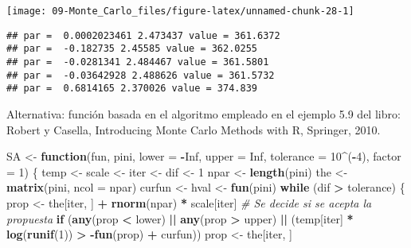 \documentclass[
]{book}
\newenvironment{Shaded}{\begin{snugshade}}{\end{snugshade}}
\newcommand{\CommentTok}[1]{\textcolor[rgb]{0.56,0.35,0.01}{\textit{#1}}}
\newcommand{\ControlFlowTok}[1]{\textcolor[rgb]{0.13,0.29,0.53}{\textbf{#1}}}
\newcommand{\DataTypeTok}[1]{\textcolor[rgb]{0.13,0.29,0.53}{#1}}
\newcommand{\DecValTok}[1]{\textcolor[rgb]{0.00,0.00,0.81}{#1}}
\newcommand{\KeywordTok}[1]{\textcolor[rgb]{0.13,0.29,0.53}{\textbf{#1}}}
\newcommand{\NormalTok}[1]{#1}
\newcommand{\OperatorTok}[1]{\textcolor[rgb]{0.81,0.36,0.00}{\textbf{#1}}}
\newcommand{\OtherTok}[1]{\textcolor[rgb]{0.56,0.35,0.01}{#1}}
\newcommand{\StringTok}[1]{\textcolor[rgb]{0.31,0.60,0.02}{#1}}
\theoremstyle{break}
\theoremstyle{definition}
\theoremstyle{definition}
\theoremstyle{definition}
\theoremstyle{remark}
\begin{document}
\begin{center}\texttt{[image: 09-Monte\_Carlo\_files/figure-latex/unnamed-chunk-28-1]} \end{center}

\begin{verbatim}
## par =  0.0002023461 2.473437 value = 361.6372 
## par =  -0.182735 2.45585 value = 362.0255 
## par =  -0.0281341 2.484467 value = 361.5801 
## par =  -0.03642928 2.488626 value = 361.5732 
## par =  0.6814165 2.370026 value = 374.839
\end{verbatim}

Alternativa: función basada en el algoritmo empleado en el ejemplo 5.9 del libro:
Robert y Casella, Introducing Monte Carlo Methods with R, Springer, 2010.

\begin{Shaded}
\begin{Highlighting}[]
\NormalTok{SA <-}\StringTok{ }\ControlFlowTok{function}\NormalTok{(fun, pini, }\DataTypeTok{lower =} \OperatorTok{-}\OtherTok{Inf}\NormalTok{, }\DataTypeTok{upper =} \OtherTok{Inf}\NormalTok{, }\DataTypeTok{tolerance =} \DecValTok{10}\OperatorTok{^}\NormalTok{(}\OperatorTok{-}\DecValTok{4}\NormalTok{), }\DataTypeTok{factor =} \DecValTok{1}\NormalTok{) \{}
\NormalTok{  temp <-}\StringTok{ }\NormalTok{scale <-}\StringTok{ }\NormalTok{iter <-}\StringTok{ }\NormalTok{dif <-}\StringTok{ }\DecValTok{1}
\NormalTok{  npar <-}\StringTok{ }\KeywordTok{length}\NormalTok{(pini) }
\NormalTok{  the <-}\StringTok{ }\KeywordTok{matrix}\NormalTok{(pini, }\DataTypeTok{ncol =}\NormalTok{ npar)}
\NormalTok{  curfun <-}\StringTok{ }\NormalTok{hval <-}\StringTok{ }\KeywordTok{fun}\NormalTok{(pini)}
  \ControlFlowTok{while}\NormalTok{ (dif }\OperatorTok{>}\StringTok{ }\NormalTok{tolerance) \{}
\NormalTok{    prop <-}\StringTok{ }\NormalTok{the[iter, ] }\OperatorTok{+}\StringTok{ }\KeywordTok{rnorm}\NormalTok{(npar) }\OperatorTok{*}\StringTok{ }\NormalTok{scale[iter]}
    \CommentTok{# Se decide si se acepta la propuesta}
    \ControlFlowTok{if}\NormalTok{ (}\KeywordTok{any}\NormalTok{(prop }\OperatorTok{<}\StringTok{ }\NormalTok{lower) }\OperatorTok{||}\StringTok{ }\KeywordTok{any}\NormalTok{(prop }\OperatorTok{>}\StringTok{ }\NormalTok{upper) }\OperatorTok{||}\StringTok{ }
\StringTok{        }\NormalTok{(temp[iter] }\OperatorTok{*}\StringTok{ }\KeywordTok{log}\NormalTok{(}\KeywordTok{runif}\NormalTok{(}\DecValTok{1}\NormalTok{)) }\OperatorTok{>}\StringTok{ }\OperatorTok{-}\KeywordTok{fun}\NormalTok{(prop) }\OperatorTok{+}\StringTok{ }\NormalTok{curfun))  prop <-}\StringTok{ }\NormalTok{the[iter, ]}

\end{Highlighting}
\end{Shaded}
\end{document}
